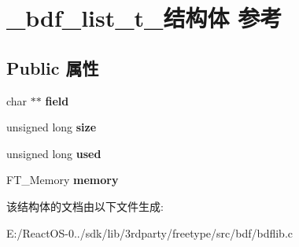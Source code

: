 \hypertarget{struct__bdf__list__t__}{}\section{\+\_\+bdf\+\_\+list\+\_\+t\+\_\+结构体 参考}
\label{struct__bdf__list__t__}
\subsection*{Public 属性}
\begin{DoxyCompactItemize}
\item 
\mbox{\label{struct__bdf__list__t___a5a604279ddb1852424e2b36e547636e1}} 
char $\ast$$\ast$ {\bfseries field}
\item 
\mbox{\label{struct__bdf__list__t___af735d1b36a5058fba9814c3f1ffa0665}} 
unsigned long {\bfseries size}
\item 
\mbox{\label{struct__bdf__list__t___a4ef35c698acda6adcaee729cf090789c}} 
unsigned long {\bfseries used}
\item 
\mbox{\label{struct__bdf__list__t___a44aed614137151f94e2def0a70731416}} 
F\+T\+\_\+\+Memory {\bfseries memory}
\end{DoxyCompactItemize}


该结构体的文档由以下文件生成\+:\begin{DoxyCompactItemize}
\item 
E\+:/\+React\+O\+S-\/0../sdk/lib/3rdparty/freetype/src/bdf/bdflib.\+c\end{DoxyCompactItemize}

